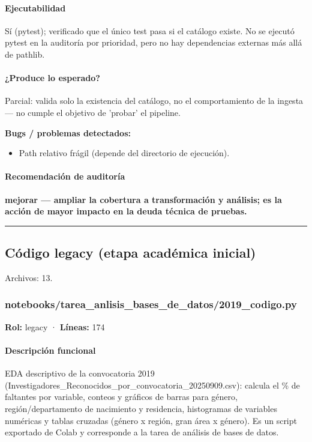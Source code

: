 \paragraph{Ejecutabilidad}
Sí (pytest); verificado que el único test pasa si el catálogo existe. No se ejecutó pytest en la auditoría por prioridad, pero no hay dependencias externas más allá de pathlib.

\paragraph{¿Produce lo esperado?}
Parcial: valida solo la existencia del catálogo, no el comportamiento de la ingesta --- no cumple el objetivo de 'probar' el pipeline.

\begin{tcolorbox}[riesgo]
\textbf{Bugs / problemas detectados:}
\begin{itemize}
  \item Path relativo frágil (depende del directorio de ejecución).
\end{itemize}
\end{tcolorbox}

\paragraph{Recomendación de auditoría}
\textbf{mejorar --- ampliar la cobertura a transformación y análisis; es la acción de mayor impacto en la deuda técnica de pruebas.}

\medskip
\hrule

\subsection{Código legacy (etapa académica inicial)}
\noindent Archivos: 13.

\subsubsection{notebooks/tarea\_anlisis\_bases\_de\_datos/2019\_codigo.py}
\textbf{Rol:} legacy · \textbf{Líneas:} 174

\paragraph{Descripción funcional}
EDA descriptivo de la convocatoria 2019 (Investigadores\_Reconocidos\_por\_convocatoria\_20250909.csv): calcula el \% de faltantes por variable, conteos y gráficos de barras para género, región/departamento de nacimiento y residencia, histogramas de variables numéricas y tablas cruzadas (género x región, gran área x género). Es un script exportado de Colab y corresponde a la tarea de análisis de bases de datos.

